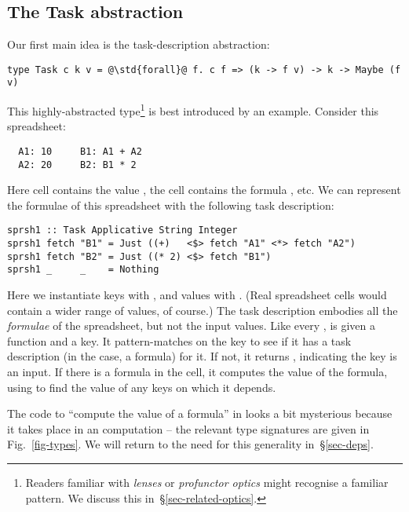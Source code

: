 \subsection{The Task abstraction}\label{sec-task}

Our first main idea is the task-description abstraction:
\begin{verbatim}
type Task c k v = @\std{forall}@ f. c f => (k -> f v) -> k -> Maybe (f v)
\end{verbatim}
This highly-abstracted type\footnote{Readers familiar with \emph{lenses} or
\emph{profunctor optics} might recognise a familiar pattern. We discuss this
in~\S\ref{sec-related-optics}.} is best introduced by an example.
Consider this \Excel spreadsheet:
\vspace{1mm}
\begin{verbatim}
  A1: 10     B1: A1 + A2
  A2: 20     B2: B1 * 2
\end{verbatim}
\vspace{1mm}
Here cell  contains the value , the cell  contains
the formula , etc. We can represent the formulae of this spreadsheet
with the following task description:
\vspace{1mm}
\begin{verbatim}
sprsh1 :: Task Applicative String Integer
sprsh1 fetch "B1" = Just ((+)   <$> fetch "A1" <*> fetch "A2")
sprsh1 fetch "B2" = Just ((* 2) <$> fetch "B1")
sprsh1 _     _    = Nothing
\end{verbatim}
\vspace{1mm}
Here we instantiate keys  with , and values  with .
(Real spreadsheet cells would contain a wider range of values, of course.)
The task description  embodies all the \emph{formulae} of the spreadsheet,
but not the input values.  Like every ,  is given a
 function and a key. It pattern-matches on the key to see if it has a
task description (in the \Excel case, a formula) for it. If not, it returns
, indicating the key is an input. If there is a formula in the cell,
it computes the value of the formula, using  to find the value of any
keys on which it depends.

The code to ``compute the value of a formula'' in  looks a bit mysterious
because it takes place in an  computation \cite{mcbride2008applicative}
-- the relevant type signatures are given in Fig.~\ref{fig-types}. We will
return to the need for this generality in~\S\ref{sec-deps}.


